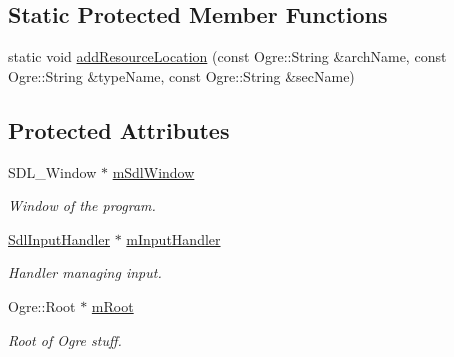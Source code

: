 \subsection*{Static Protected Member Functions}
\begin{DoxyCompactItemize}
\item 
static void \hyperlink{class_common_1_1_graphics_system_a25c1257066ca90c4c6d9cf0dc1fa2bfb}{add\+Resource\+Location} (const Ogre\+::\+String \&arch\+Name, const Ogre\+::\+String \&type\+Name, const Ogre\+::\+String \&sec\+Name)
\end{DoxyCompactItemize}
\subsection*{Protected Attributes}
\begin{DoxyCompactItemize}
\item 
\mbox{\label{class_common_1_1_graphics_system_a92bb62174a5eb357a6765c31891649b5}} 
S\+D\+L\+\_\+\+Window $\ast$ \hyperlink{class_common_1_1_graphics_system_a92bb62174a5eb357a6765c31891649b5}{m\+Sdl\+Window}
\begin{DoxyCompactList}\small\item\em Window of the program. \end{DoxyCompactList}\item 
\mbox{\label{class_common_1_1_graphics_system_a9ddbb67b87143d1c124e55a96d875150}} 
\hyperlink{class_common_1_1_sdl_input_handler}{Sdl\+Input\+Handler} $\ast$ \hyperlink{class_common_1_1_graphics_system_a9ddbb67b87143d1c124e55a96d875150}{m\+Input\+Handler}
\begin{DoxyCompactList}\small\item\em Handler managing input. \end{DoxyCompactList}\item 
\mbox{\label{class_common_1_1_graphics_system_adf9abc6e0d78256c7b8d2b16c01a6b98}} 
Ogre\+::\+Root $\ast$ \hyperlink{class_common_1_1_graphics_system_adf9abc6e0d78256c7b8d2b16c01a6b98}{m\+Root}
\begin{DoxyCompactList}\small\item\em Root of Ogre stuff. \end{DoxyCompactList}\item 
\mbox{\label{class_common_1_1_graphics_system_a14a142b2ccd792b6b50b9240b8b03bcd}} 

\end{DoxyCompactItemize}
